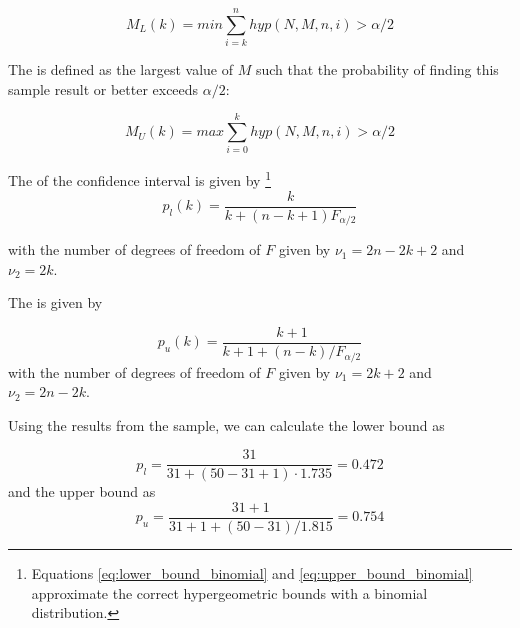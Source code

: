 \begin{equation}
  M_L(k) = min{\sum_{i=k}^n hyp(N, M, n, i) > \alpha /2}
\end{equation}

The  is defined as the largest value of $M$ such that the probability of finding this sample result or better exceeds $\alpha/2$:

\begin{equation}
  M_U(k) = max{\sum_{i=0}^k hyp(N, M, n, i) > \alpha /2}
  \label{eq:upper_bound}
\end{equation}

The  of the confidence interval is given by
\footnote{Equations \ref{eq:lower_bound_binomial} and \ref{eq:upper_bound_binomial} approximate the correct hypergeometric bounds with a binomial distribution.}
\begin{equation}
  p_l(k) = \frac{k}{k + (n - k + 1) F_{\alpha/2}}
\label{eq:lower_bound_binomial}
\end{equation}

with the number of degrees of freedom of $F$ given by $\nu_1 = 2n - 2k + 2$ and $\nu_2 = 2k$.

The  is given by

\begin{equation}
  p_u(k) = \frac{k + 1}{k + 1 + (n - k)/F_{\alpha/2}}
\label{eq:upper_bound_binomial}
\end{equation}
with the number of degrees of freedom of $F$ given by $\nu_1 = 2k + 2$ and $\nu_2 = 2n - 2k$.

\bigskip
Using the results from the sample, we can calculate the lower bound as

\begin{equation*}
  p_l = \frac{31}{31 + (50 - 31 + 1) \cdot 1.735} = 0.472
\end{equation*}
and the upper bound as
\begin{equation*}
  p_u = \frac{31 + 1}{31 + 1 + (50 - 31)/1.815} = 0.754
\end{equation*}

